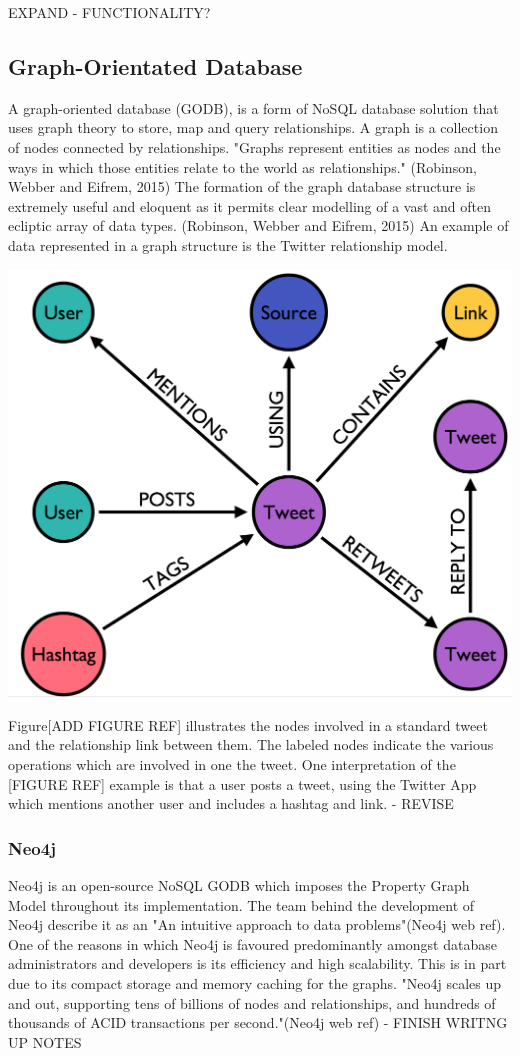 EXPAND - FUNCTIONALITY? 

\subsection{Graph-Orientated Database}
A graph-oriented database (GODB), is a form of NoSQL database solution that uses graph theory to store, map and query relationships. A graph is a collection of nodes connected by relationships. "Graphs represent entities as nodes and the ways in which those entities relate to the world as relationships." (Robinson, Webber and Eifrem, 2015) The formation of the graph database structure is extremely useful and eloquent as it permits clear modelling of a vast and often ecliptic array of data types. (Robinson, Webber and Eifrem, 2015) An example of data represented in a graph structure is the Twitter relationship model. \begin{center}\includegraphics[width=0.3\linewidth]{images/graphdb_twitter}\end{center}  Figure[ADD FIGURE REF] illustrates the nodes involved in a standard tweet and the relationship link between them. The labeled nodes indicate the various operations which are involved in one the tweet. One interpretation of the [FIGURE REF] example is that a user posts a tweet, using the Twitter App which mentions another user and includes a hashtag and link. - REVISE

\subsubsection{Neo4j}\label{neo}
Neo4j is an open-source NoSQL GODB which imposes the Property Graph Model throughout its implementation. The team behind the development of Neo4j describe it as an "An intuitive approach to data problems"(Neo4j web ref). One of the reasons in which Neo4j is favoured predominantly amongst database administrators and developers is its efficiency and high scalability. This is in part due to its compact storage and memory caching for the graphs. "Neo4j scales up and out, supporting tens of billions of nodes and relationships, and hundreds of thousands of ACID transactions per second."(Neo4j web ref) - FINISH WRITNG UP NOTES

